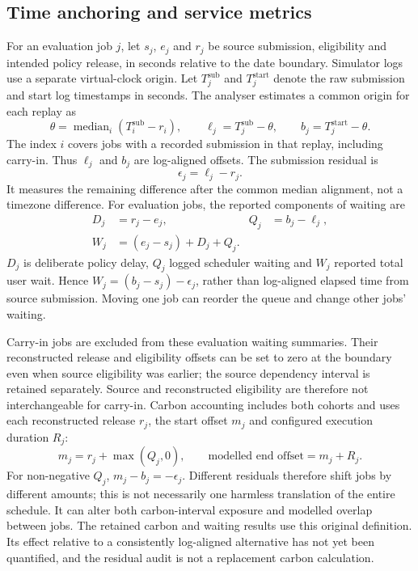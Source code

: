 \subsection{Time anchoring and service metrics}\label{sec:time-anchoring}
For an evaluation job $j$, let $s_j$, $e_j$ and $r_j$ be source submission, eligibility and intended policy release, in seconds relative to the date boundary. Simulator logs use a separate virtual-clock origin. Let $T_j^{\mathrm{sub}}$ and $T_j^{\mathrm{start}}$ denote the raw submission and start log timestamps in seconds. The analyser estimates a common origin for each replay as
\begin{equation}
\theta=\operatorname{median}_i(T_i^{\mathrm{sub}}-r_i),\qquad
\ell_j=T_j^{\mathrm{sub}}-\theta,\qquad b_j=T_j^{\mathrm{start}}-\theta.
\end{equation}
The index $i$ covers jobs with a recorded submission in that replay, including carry-in. Thus $\ell_j$ and $b_j$ are log-aligned offsets. The submission residual is
\begin{equation}\label{eq:submission-residual}
\epsilon_j=\ell_j-r_j.
\end{equation}
It measures the remaining difference after the common median alignment, not a timezone difference. For evaluation jobs, the reported components of waiting are
\begin{align}
D_j&=r_j-e_j, & Q_j&=b_j-\ell_j,\\
W_j&=(e_j-s_j)+D_j+Q_j.
\end{align}
$D_j$ is deliberate policy delay, $Q_j$ logged scheduler waiting and $W_j$ reported total user wait. Hence \mbox{$W_j=(b_j-s_j)-\epsilon_j$}, rather than log-aligned elapsed time from source submission. Moving one job can reorder the queue and change other jobs' waiting.

Carry-in jobs are excluded from these evaluation waiting summaries. Their reconstructed release and eligibility offsets can be set to zero at the boundary even when source eligibility was earlier; the source dependency interval is retained separately. Source and reconstructed eligibility are therefore not interchangeable for carry-in. Carbon accounting includes both cohorts and uses each reconstructed release $r_j$, the start offset $m_j$ and configured execution duration $R_j$:
\begin{equation}\label{eq:anchored-start}
m_j=r_j+\max(Q_j,0),\qquad \text{modelled end offset}=m_j+R_j.
\end{equation}
For non-negative $Q_j$, $m_j-b_j=-\epsilon_j$. Different residuals therefore shift jobs by different amounts; this is not necessarily one harmless translation of the entire schedule. It can alter both carbon-interval exposure and modelled overlap between jobs. The retained carbon and waiting results use this original definition. Its effect relative to a consistently log-aligned alternative has not yet been quantified, and the residual audit is not a replacement carbon calculation.


